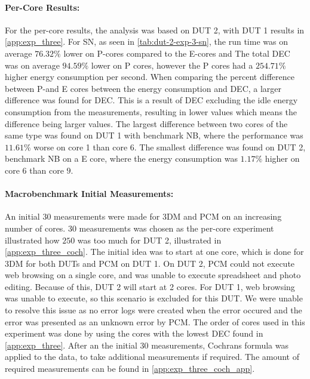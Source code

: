 \paragraph{Per-Core Results:} For the per-core results, the analysis was based on DUT 2, with DUT 1 results in \cref{app:exp_three}. For SN, as seen in \cref{tab:dut-2-exp-3-sn}, the run time was on average $76.32\%$ lower on P-cores compared to the E-cores and The total DEC was on average $94.59\%$ lower on P cores, however the P cores had a $254.71\%$ higher energy consumption per second. When comparing the percent difference between P-and E cores between the energy consumption and DEC, a larger difference was found for DEC. This is a result of DEC excluding the idle energy consumption from the measurements, resulting in lower values which means the difference being larger values. %
The largest difference between two cores of the same type was found on DUT 1 with benchmark NB, where the performance was $11.61\%$ worse on core 1 than core 6. The smallest difference was found on DUT 2, benchmark NB on a E core, where the energy consumption was $1.17\%$ higher on core $6$ than core $9$.







\paragraph*{Macrobenchmark Initial Measurements:} An initial $30$ measurements were made for 3DM and PCM on an increasing number of cores. $30$ measurements was chosen as the per-core experiment illustrated how $250$ was too much for DUT 2, illustrated in \cref{app:exp_three_coch}. The initial idea was to start at one core, which is done for 3DM for both DUTs and PCM on DUT 1. On DUT 2, PCM could not execute web browsing on a single core, and was unable to execute spreadsheet and photo editing. Because of this, DUT 2 will start at 2 cores. For DUT 1, web browsing was unable to execute, so this scenario is excluded for this DUT. We were unable to resolve this issue as no error logs were created when the error occured and the error was presented as an unknown error by PCM. The order of cores used in this experiment was done by using the cores with the lowest DEC found in \cref{app:exp_three}. After an the initial $30$ measurements, Cochrans formula was applied to the data, to take additional measurements if required. The amount of required measurements can be found in \cref{app:exp_three_coch_app}.

